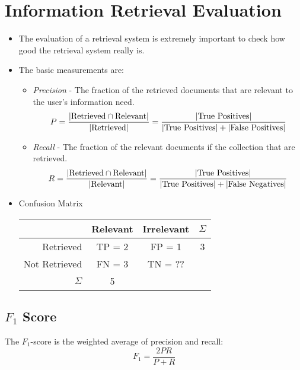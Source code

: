     \section{Information Retrieval Evaluation} %
        \begin{itemize}
        	\item The evaluation of a retrieval system is extremely important to check how good the retrieval system really is.
        	\item The basic measurements are:
        		\begin{itemize}
        			\item \textit{Precision} - The fraction of the retrieved documents that are relevant to the user's information need.
        				\begin{equation*}
            				P = \frac{\abs{\text{Retrieved} \cap \text{Relevant}}}{\abs{\text{Retrieved}}} = \frac{\abs{\text{True Positives}}}{\abs{\text{True Positives}} + \abs{\text{False Positives}}}
        				\end{equation*}
        			\item \textit{Recall} - The fraction of the relevant documents if the collection that are retrieved.
        				\begin{equation*}
            				R = \frac{\abs{\text{Retrieved} \cap \text{Relevant}}}{\abs{\text{Relevant}}} = \frac{\abs{\text{True Positives}}}{\abs{\text{True Positives}} + \abs{\text{False Negatives}}}
        				\end{equation*}
        		\end{itemize}
        	\item Confusion Matrix
        		\begin{table}[H]
        			\centering
        			\begin{tabular}{r | c | c | c}
        				& Relevant & Irrelevant & \( \Sigma \) \\ \hline
        				Retrieved & TP = 2 & FP = 1 & 3 \\ \hline
        				Not Retrieved & FN = 3 & TN = ?? & \\ \hline
        				\(\Sigma\) & 5 & &
        			\end{tabular}
        		\end{table}
        \end{itemize}

        \subsection{\( F _ 1 \) Score} %
            The \(F_1\)-score is the weighted average of precision and recall:
            \begin{equation*}
                F_1 = \frac{2PR}{P + R} \tag{Harmonic Mean of \(P\) and \(R\)}
            \end{equation*}
            
